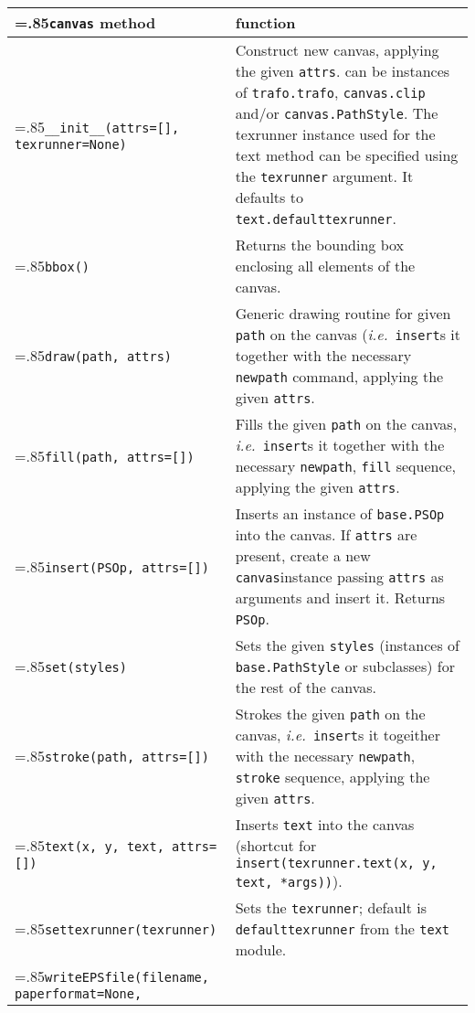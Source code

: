 \medskip
\begin{tabularx}
  {\linewidth}
  {>{\hsize=.85\hsize}X>{\raggedright\arraybackslash\hsize=1.15\hsize}X}
  \texttt{canvas} method & function \\
  \hline
  \texttt{\_\_init\_\_(attrs=[],\newline
  \phantom{\_\_init\_\_(}texrunner=None)} & Construct new
  canvas, applying the given \texttt{attrs}. can be instances of \texttt{trafo.trafo}, \texttt{canvas.clip}
  and/or \texttt{canvas.PathStyle}. 
  The texrunner instance used for the text method can be
  specified using the \texttt{texrunner} argument. It defaults to
  \texttt{text.defaulttexrunner}.\\
  \texttt{bbox()} &
  Returns the bounding box enclosing all elements of the canvas.\\
  \texttt{draw(path, attrs)} &
  Generic drawing routine for given \texttt{path} on the canvas (\textit{i.e.}\
  \texttt{insert}s it together with the necessary \texttt{newpath}
  command, applying the given \texttt{attrs}. \\
  \texttt{fill(path, attrs=[])} &
  Fills the given \texttt{path} on the canvas, \textit{i.e.}\
  \texttt{insert}s it together with the necessary \texttt{newpath},
  \texttt{fill} sequence, applying the given \texttt{attrs}. \\
  \texttt{insert(PSOp, attrs=[])} &
  Inserts an instance of \texttt{base.PSOp} into the canvas.
  If \texttt{attrs} are present, create a new \texttt{canvas}instance passing
  \texttt{attrs} as arguments and insert it. Returns \texttt{PSOp}.\\
  \texttt{set(styles)} &
  Sets the given \texttt{styles} (instances of \texttt{base.PathStyle} or
  subclasses) for the rest of the canvas.\\
  \texttt{stroke(path, attrs=[])} & 
  Strokes the given \texttt{path} on the canvas, \textit{i.e.}\
  \texttt{insert}s it togeither with the necessary \texttt{newpath},
  \texttt{stroke} sequence, applying the given \texttt{attrs}. \\
  \texttt{text(x, y, text, attrs=[])} &
  Inserts \texttt{text} into the
  canvas (shortcut for
  \texttt{insert(texrunner.text(x, y, text, *args))}).\\
  \texttt{settexrunner(texrunner)} &
  Sets the \texttt{texrunner}; default is \texttt{defaulttexrunner}
  from the \texttt{text} module.\\
    \texttt{writeEPSfile(filename, 
      \newline\phantom{writeEPSfile(}paperformat=None, 
}
\end{tabularx}
